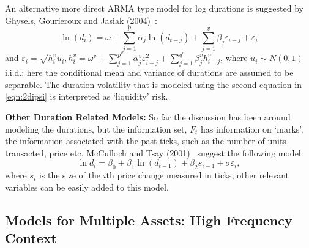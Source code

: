 An alternative more direct ARMA type model for log durations is suggested by Ghysels, Gourieroux and Jasiak (2004)~\cite{jasiak}:
        \begin{equation} \label{eqn:21lnd}
        	\ln{(d_i)} = \omega + \sum_{j=1}^p \alpha_j \ln{(d_{t-j})} + \sum_{j=1}^v \beta_j \varepsilon_{i-j} + \varepsilon_i
        \end{equation}
and $\varepsilon_i = \sqrt{h_i^v} u_i, h_i^v = \omega^v + \sum_{j=1}^{p^v} \alpha_j^v \varepsilon_{i-j}^2 + \sum_{j=1}^{q^v} \beta_j^v h_{i-j}^v$, where $u_i \sim N(0,1)$ i.i.d.; here the conditional mean and variance of durations are assumed to be separable. The duration volatility that is modeled using the second equation in \eqref{eqn:2dipsi} is interpreted as `liquidity' risk. \twomedskip


\noindent \textbf{Other Duration Related Models:} So far the discussion has been around modeling the durations, but the information set, $F_t$ has information on `marks', the information associated with the past ticks, such as the number of units transacted, price etc. McCulloch and Tsay (2001)~\cite{mccullochtsay07} suggest the following model:
	\begin{equation} \label{eqn:2lndi}
	\ln{d_i} = \beta_0 + \beta_1 \ln{(d_{t-1})} + \beta_2s_{i-1} + \sigma\varepsilon_i,
	\end{equation}
where $s_i$ is the size of the $i$th price change measured in ticks; other relevant variables can be easily added to this model.



\subsection{Models for Multiple Assets: High Frequency Context}


